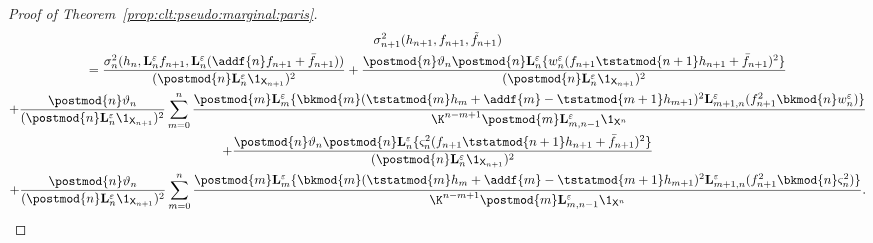 \begin{proof}[Proof of Theorem~\ref{prop:clt:pseudo:marginal:paris}]
\begin{multline} \label{eq:as:var:second:expression}
\sigma^2_{n + 1}(h_{n + 1}, f_{n + 1}, \ftd{n + 1}) \\
= \frac{\sigma^2_n(h_n, \ukmod{n} f_{n + 1}, \ukmod{n}(\addf{n} f_{n + 1} + \bar{f}_{n + 1}))}{(\postmod{n} \ukmod{n} \1_{\Xset_{n + 1}})^2}
+ \frac{\postmod{n} \adjfuncforward{n} \postmod{n} \ukmod{n} \{\wgtfuncmod{n}(f_{n + 1} \tstatmod{n + 1} h_{n + 1} + \bar{f}_{n + 1})^2 \}}{(\postmod{n} \ukmod{n} \1_{\Xset_{n + 1}})^2} \\
+ \frac{\postmod{n} \adjfuncforward{n}}{(\postmod{n} \ukmod{n} \1_{\Xset_{n + 1}})^2} \sum_{m = 0}^n \frac{\postmod{m} \ukmod{m}\{\bkmod{m}(\tstatmod{m} h_m + \addf{m} - \tstatmod{m + 1} h_{m + 1})^2 \ukmod{m + 1, n}(f_{n + 1}^2 \bkmod{n} \wgtfuncmod{n})\}}{\K^{n - m + 1} \postmod{m} \ukmod{m, n - 1} \1_{\Xset^n}} \\
+ \frac{\postmod{n} \adjfuncforward{n} \postmod{n} \ukmod{n} \{\ukestvar{n}(f_{n + 1} \tstatmod{n + 1} h_{n + 1} + \bar{f}_{n + 1})^2 \}}{(\postmod{n} \ukmod{n} \1_{\Xset_{n + 1}})^2} \\
+ \frac{\postmod{n} \adjfuncforward{n}}{(\postmod{n} \ukmod{n} \1_{\Xset_{n + 1}})^2} \sum_{m = 0}^n \frac{\postmod{m} \ukmod{m}\{\bkmod{m}(\tstatmod{m} h_m + \addf{m} - \tstatmod{m + 1} h_{m + 1})^2 \ukmod{m + 1, n}(f_{n + 1}^2 \bkmod{n} \ukestvar{n})\}}{\K^{n - m + 1} \postmod{m} \ukmod{m, n - 1} \1_{\Xset^n}}. 
\end{multline}


\end{proof}
